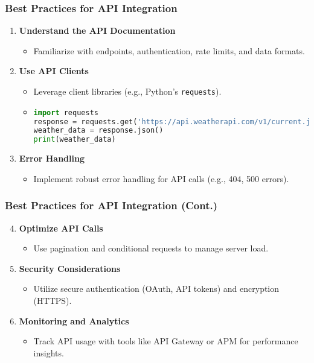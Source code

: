 \documentclass[aspectratio=169]{beamer}
\begin{document}
\begin{frame}[fragile]
    \frametitle{Best Practices for API Integration}
    \begin{enumerate}
        \item \textbf{Understand the API Documentation}
        \begin{itemize}
            \item Familiarize with endpoints, authentication, rate limits, and data formats.
        \end{itemize}

        \item \textbf{Use API Clients}
        \begin{itemize}
            \item Leverage client libraries (e.g., Python's \texttt{requests}).
            \item \begin{lstlisting}[language=Python]
import requests
response = requests.get('https://api.weatherapi.com/v1/current.json?key=YOUR_API_KEY&q=London')
weather_data = response.json()
print(weather_data)
            \end{lstlisting}
        \end{itemize}

        \item \textbf{Error Handling}
        \begin{itemize}
            \item Implement robust error handling for API calls (e.g., 404, 500 errors).
        \end{itemize}
    \end{enumerate}
\end{frame}

\begin{frame}[fragile]
    \frametitle{Best Practices for API Integration (Cont.)}
    \begin{enumerate}
        \setcounter{enumi}{3} %
        \item \textbf{Optimize API Calls}
        \begin{itemize}
            \item Use pagination and conditional requests to manage server load.
        \end{itemize}

        \item \textbf{Security Considerations}
        \begin{itemize}
            \item Utilize secure authentication (OAuth, API tokens) and encryption (HTTPS).
        \end{itemize}

        \item \textbf{Monitoring and Analytics}
        \begin{itemize}
            \item Track API usage with tools like API Gateway or APM for performance insights.
        \end{itemize}
    \end{enumerate}
\end{frame}
\end{document}
